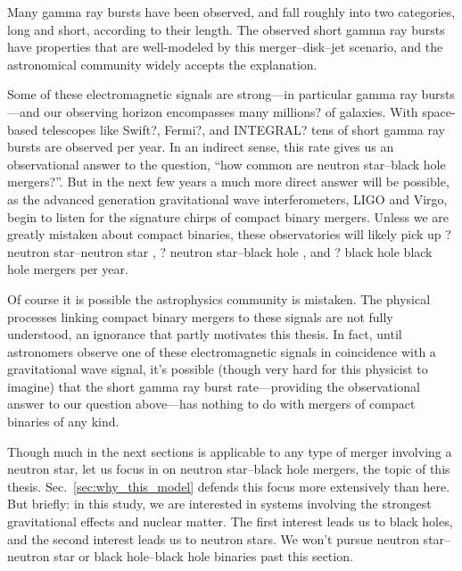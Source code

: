\begin{itemize}
    Many gamma ray bursts have
    been observed, and fall roughly into two categories, long and short,
    according to their length. The observed short gamma ray bursts have
    properties that are well-modeled by this merger--disk--jet scenario,
    and the astronomical community widely accepts the explanation.
\end{itemize}

Some of these electromagnetic signals are strong---in particular gamma ray
bursts---and our observing horizon encompasses many millions? of galaxies.
With space-based telescopes like Swift?, Fermi?, and INTEGRAL?
tens of short gamma ray bursts are observed per year.
In an indirect sense, this rate gives us an observational answer to the question,
``how common are neutron star--black hole mergers?''.
But in the next few years a much more direct answer will be possible, as the
advanced generation gravitational wave interferometers, LIGO and Virgo, begin to
listen for the signature chirps of compact binary mergers. Unless we are greatly
mistaken about compact binaries, these observatories will likely pick up
? neutron star--neutron star \nsns,
? neutron star--black hole \nsbh, and
? black hole black hole \bhbh mergers per year.

Of course it is possible the astrophysics community is mistaken.
The physical processes linking compact binary mergers to these
signals are not fully understood, an ignorance that partly motivates this thesis.
In fact, until astronomers observe one of these electromagnetic signals in
coincidence with a gravitational wave signal, it's possible (though very hard
for this physicist to imagine) that the short
gamma ray burst rate---providing the observational answer to our question
above---has nothing to do with mergers of compact binaries of any kind.

Though much in the next sections is applicable to any type of merger involving
a neutron star, let us focus in on neutron star--black hole \nsbh
mergers, the topic of this thesis. Sec.~\ref{sec:why_this_model} defends this
focus more extensively than here.
But briefly: in this study, we are interested in systems involving the
strongest gravitational effects and nuclear matter. The first interest leads us
to black holes, and the second interest leads us to neutron stars.
We won't pursue neutron star--neutron star
\nsns or black hole--black hole \bhbh binaries past this section.

